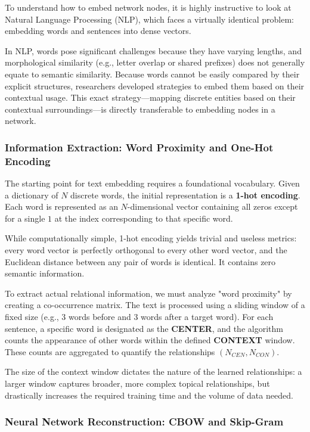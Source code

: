 To understand how to embed network nodes, it is highly instructive to look at Natural Language Processing (NLP), which faces a virtually identical problem: embedding words and sentences into dense vectors.

In NLP, words pose significant challenges because they have varying lengths, and morphological similarity (e.g., letter overlap or shared prefixes) does not generally equate to semantic similarity. Because words cannot be easily compared by their explicit structures, researchers developed strategies to embed them based on their contextual usage. This exact strategy—mapping discrete entities based on their contextual surroundings—is directly transferable to embedding nodes in a network.

\subsubsection{Information Extraction: Word Proximity and One-Hot Encoding}

The starting point for text embedding requires a foundational vocabulary. Given a dictionary of $N$ discrete words, the initial representation is a \textbf{1-hot encoding}. Each word is represented as an $N$-dimensional vector containing all zeros except for a single $1$ at the index corresponding to that specific word.

While computationally simple, 1-hot encoding yields trivial and useless metrics: every word vector is perfectly orthogonal to every other word vector, and the Euclidean distance between any pair of words is identical. It contains zero semantic information.

To extract actual relational information, we must analyze "word proximity" by creating a co-occurrence matrix. The text is processed using a sliding window of a fixed size (e.g., 3 words before and 3 words after a target word). For each sentence, a specific word is designated as the \textbf{CENTER}, and the algorithm counts the appearance of other words within the defined \textbf{CONTEXT} window. These counts are aggregated to quantify the relationships $(N_{CEN}, N_{CON})$.

The size of the context window dictates the nature of the learned relationships: a larger window captures broader, more complex topical relationships, but drastically increases the required training time and the volume of data needed.

\subsubsection{Neural Network Reconstruction: CBOW and Skip-Gram}

